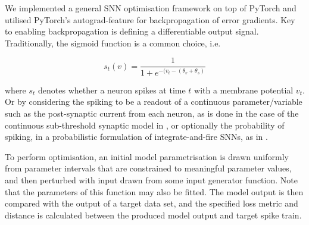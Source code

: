 \documentclass[mphil,deptreport,ianc]{infthesis} %
\begin{document}
We implemented a general SNN optimisation framework on top of PyTorch \cite{Paszke2017, Paszke2019} and utilised PyTorch's autograd-feature for backpropagation of error gradients.
Key to enabling backpropagation is defining a differentiable output signal. Traditionally, the sigmoid function is a common choice, i.e.

\begin{equation}
    s_t(v) = \frac{1}{1+e^{-(v_t-(\theta_v + \theta_s)}}
\end{equation}

where $s_t$ denotes whether a neuron spikes at time $t$ with a membrane potential $v_t$. Or by considering the spiking to be a readout of a continuous parameter/variable such as the post-synaptic current from each neuron, as is done in the case of the continuous sub-threshold synaptic model in \cite{Huh2017}, or optionally the probability of spiking, in a probabilistic formulation of integrate-and-fire SNNs, as in \cite{Rene2020}.

To perform optimisation, an initial model parametrisation is drawn uniformly from parameter intervals that are constrained to meaningful parameter values, and then perturbed with input drawn from some input generator function. Note that the parameters of this function may also be fitted.
The model output is then compared with the output of a target data set, and the specified loss metric and distance is calculated between the produced model output and target spike train.


\end{document}
